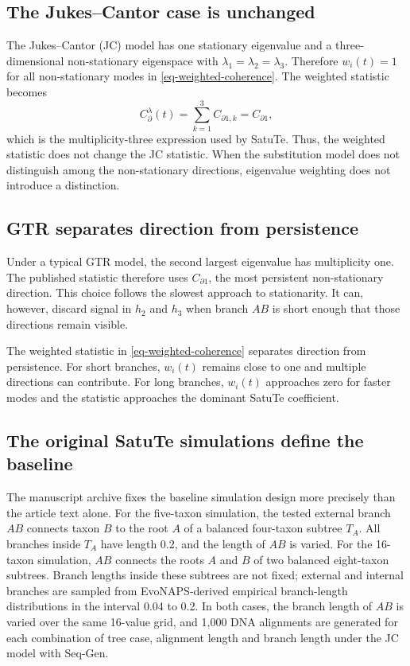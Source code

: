 \documentclass[11pt]{article}
\begin{document}
\subsection*{The Jukes--Cantor case is unchanged}

The Jukes--Cantor (JC) model has one stationary eigenvalue and a three-dimensional non-stationary eigenspace with \(\lambda_1=\lambda_2=\lambda_3\). Therefore \(w_i(t)=1\) for all non-stationary modes in \cref{eq-weighted-coherence}. The weighted statistic becomes
\begin{equation}
C_{\partial}^{\lambda}(t)
=
\sum_{k=1}^{3} C_{\partial 1,k}
=
C_{\partial 1},
\label{eq-jc-collapse}
\end{equation}
which is the multiplicity-three expression used by SatuTe. Thus, the weighted statistic does not change the JC statistic. When the substitution model does not distinguish among the non-stationary directions, eigenvalue weighting does not introduce a distinction.

\subsection*{GTR separates direction from persistence}

Under a typical GTR model, the second largest eigenvalue has multiplicity one. The published statistic therefore uses \(C_{\partial 1}\), the most persistent non-stationary direction. This choice follows the slowest approach to stationarity. It can, however, discard signal in \(h_2\) and \(h_3\) when branch \(AB\) is short enough that those directions remain visible.

The weighted statistic in \cref{eq-weighted-coherence} separates direction from persistence. For short branches, \(w_i(t)\) remains close to one and multiple directions can contribute. For long branches, \(w_i(t)\) approaches zero for faster modes and the statistic approaches the dominant SatuTe coefficient.

\subsection*{The original SatuTe simulations define the baseline}

The manuscript archive fixes the baseline simulation design more precisely than the article text alone. For the five-taxon simulation, the tested external branch \(AB\) connects taxon \(B\) to the root \(A\) of a balanced four-taxon subtree \(T_A\). All branches inside \(T_A\) have length 0.2, and the length of \(AB\) is varied. For the 16-taxon simulation, \(AB\) connects the roots \(A\) and \(B\) of two balanced eight-taxon subtrees. Branch lengths inside these subtrees are not fixed; external and internal branches are sampled from EvoNAPS-derived empirical branch-length distributions in the interval 0.04 to 0.2. In both cases, the branch length of \(AB\) is varied over the same 16-value grid, and 1,000 DNA alignments are generated for each combination of tree case, alignment length and branch length under the JC model with Seq-Gen.
\end{document}
